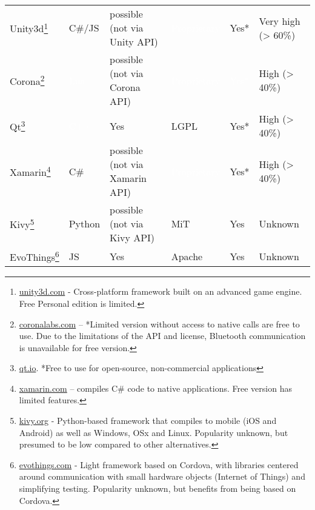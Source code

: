 \begin{landscape}
\begin{table}[ht]
\begin{minipage}{\textwidth}
\begin{tabular}{llllll}
Unity3d\footnote{\href{http://unity3d.com}{unity3d.com} - Cross-platform framework built on an advanced game engine. Free Personal edition is limited.}               & \cellcolor[HTML]{CDFBCD}C\#/JS & \cellcolor[HTML]{FEB24C}possible (not via Unity API)    & \cellcolor[HTML]{de2d26} \textcolor{white}{Proprietary} & \cellcolor[HTML]{FEB24C}Yes*& \cellcolor[HTML]{CDFBCD}Very high (> 60\%)\\


Corona\footnote{\href{http://coronalabs.com/}{coronalabs.com} – *Limited version without access to native calls are free to use. Due to the limitations of the API and license, Bluetooth communication is unavailable for free version.}                & \cellcolor[HTML]{de2d26} \textcolor{white}{Lua}    & \cellcolor[HTML]{FEB24C}possible (not via Corona API)   & \cellcolor[HTML]{de2d26} \textcolor{white}{Proprietary} & \cellcolor[HTML]{de2d26} \textcolor{white}{Yes*}          & \cellcolor[HTML]{CDFBCD}High (> 40\%) \\


Qt\footnote{\href{http://qt.io}{qt.io}. *Free to use for open-source, non-commercial applications}                   & \cellcolor[HTML]{de2d26} \textcolor{white}{C++}    & \cellcolor[HTML]{CDFBCD}Yes                             & \cellcolor[HTML]{D8FFD7}LGPL        & \cellcolor[HTML]{D8FFD7}Yes*& \cellcolor[HTML]{CDFBCD}High (> 40\%) \\

Xamarin\footnote{\href{http://xamarin.com}{xamarin.com} – compiles C\# code to native applications. Free version has limited features.}               & \cellcolor[HTML]{CDFBCD}C\#    & \cellcolor[HTML]{FEB24C}possible (not via Xamarin API)  & \cellcolor[HTML]{de2d26} \textcolor{white}{Proprietary} & \cellcolor[HTML]{FEB24C}Yes*                    & \cellcolor[HTML]{CDFBCD}High (> 40\%) \\


Kivy\footnote{\href{http://kivy.org}{kivy.org} - Python-based framework that compiles to mobile (iOS and Android) as well as Windows, OSx and Linux. Popularity unknown, but presumed to be low compared to other alternatives.}                  & \cellcolor[HTML]{CDFBCD}Python & \cellcolor[HTML]{FEB24C}possible (not via Kivy API)     & \cellcolor[HTML]{CDFBCD}MiT         & \cellcolor[HTML]{CDFBCD}Yes                                            & Unknown \\


EvoThings\footnote{\href{http://evothings.com/}{evothings.com} - Light framework based on Cordova, with libraries centered around communication with small hardware objects (Internet of Things) and simplifying testing. Popularity unknown, but benefits from being based on Cordova. }             & \cellcolor[HTML]{CDFBCD}JS     & \cellcolor[HTML]{CDFBCD}Yes                             & \cellcolor[HTML]{CDFBCD}Apache      & \cellcolor[HTML]{CDFBCD}Yes & Unknown \\                                            


\end{tabular}
\end{minipage}
\end{table}
\end{landscape}
